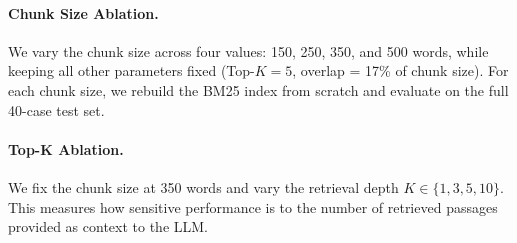 \paragraph{Chunk Size Ablation.} We vary the chunk size across four values: 150, 250, 350, and 500 words, while keeping all other parameters fixed (Top-$K = 5$, overlap = 17\% of chunk size). For each chunk size, we rebuild the BM25 index from scratch and evaluate on the full 40-case test set.

\paragraph{Top-K Ablation.} We fix the chunk size at 350 words and vary the retrieval depth $K \in \{1, 3, 5, 10\}$. This measures how sensitive performance is to the number of retrieved passages provided as context to the LLM.
